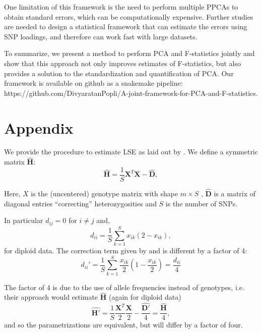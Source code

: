 \documentclass[12pt, letterpaper]{article}
\begin{document}
One limitation of this framework is the need to perform multiple PPCAs to obtain standard errors, which can be computationally expensive. Further studies are needed to design a statistical framework that can estimate the errors using SNP loadings, and therefore can work fast with large datasets.

To summarize, we present a method to perform PCA and F-statistics jointly and show that this approach not only improves estimates of F-statistics, but also provides a solution to the standardization and quantification of PCA. Our framework is available on github as a snakemake pipeline: https://github.com/DivyaratanPopli/A-joint-framework-for-PCA-and-F-statistics.





\section{Appendix}

We provide the procedure to estimate LSE as laid out by \cite{cabreros_likelihood-free_2019}. We define a symmetric matrix $\hat{\mathbf{H}}$:
\begin{equation}
    \hat{\mathbf{H}} = \frac{1}{S}\mathbf{X}^T\mathbf{X} - \hat{\mathbf{D}},
\end{equation}

Here, $X$ is the (uncentered) genotype matrix with shape $m \times S$ , $\hat{\mathbf{D}}$ is a matrix of diagonal entries ``correcting'' heterozygosities and $S$ is the number of SNPs.

In particular $d_{ij} = 0 $ for $i \neq j$ and, 
\begin{equation}
    d_{ii} = \frac{1}{S}\sum_{k=1}^S x_{ik}(2-x_{ik}),
\end{equation}
for diploid data. The correction term given by \cite{reich_reconstructing_2009} and \cite{patterson_ancient_2012} is different by a factor of 4:
\begin{equation*}
    d_{ii}' = \frac{1}{S}\sum_{k=1}^S \frac{x_{ik}}{2}(1-\frac{x_{ik}}{2}) = \frac{d_{ii}}{4}
\end{equation*}

The factor of 4 is due to the use of allele frequencies instead of genotypes, i.e. their approach would estimate $\hat{\mathbf{H}}$ (again for diploid data)
\begin{equation*}
    \hat{\mathbf{H}'} = \frac{1}{S}\frac{\mathbf{X}^T}{2}\frac{\mathbf{X}}{2} - \frac{\hat{\mathbf{D'}}}{4} = \frac{\hat{\mathbf{H}}}{4},
\end{equation*}
and so the parametrizations are equivalent, but will differ by a factor of four.
\end{document}
